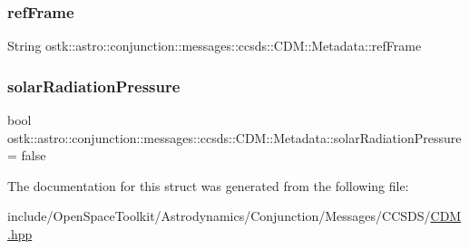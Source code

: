 \subsubsection{\texorpdfstring{ref\+Frame}{refFrame}}
{\footnotesize\ttfamily String ostk\+::astro\+::conjunction\+::messages\+::ccsds\+::\+C\+D\+M\+::\+Metadata\+::ref\+Frame}

\mbox{\label{structostk_1_1astro_1_1conjunction_1_1messages_1_1ccsds_1_1_c_d_m_1_1_metadata_a1f391661d25def1092b6051327e120cb}} 
\subsubsection{\texorpdfstring{solar\+Radiation\+Pressure}{solarRadiationPressure}}
{\footnotesize\ttfamily bool ostk\+::astro\+::conjunction\+::messages\+::ccsds\+::\+C\+D\+M\+::\+Metadata\+::solar\+Radiation\+Pressure = false}



The documentation for this struct was generated from the following file\+:\begin{DoxyCompactItemize}
\item 
include/\+Open\+Space\+Toolkit/\+Astrodynamics/\+Conjunction/\+Messages/\+C\+C\+S\+D\+S/\hyperlink{_c_d_m_8hpp}{C\+D\+M.\+hpp}\end{DoxyCompactItemize}

